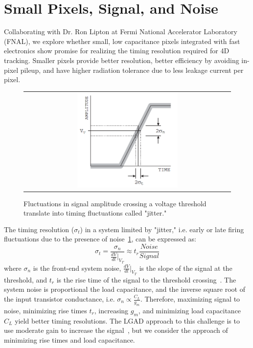 \section{Small Pixels, Signal, and Noise}
Collaborating with Dr. Ron Lipton at Fermi National Accelerator Laboratory (FNAL), we explore whether small, low capacitance pixels integrated with fast electronics show promise for realizing the timing resolution required for 4D tracking.
Smaller pixels provide better resolution, better efficiency by avoiding in-pixel pileup, and have higher radiation tolerance due to less leakage current per pixel.

\begin{figure}[h]
  \begin{center}
    \begin{tabular}{c}
        \includegraphics[width=0.5\textwidth]{fig_FastTiming/Jitter.png}
    \end{tabular}
    \caption{Fluctuations in signal amplitude crossing a voltage threshold translate into timing fluctuations called "jitter."
            }            
    \label{Jitter}
  \end{center}
\end{figure}
The timing resolution ($\sigma_t$) in a system limited by "jitter," i.e. early or late firing fluctuations due to the presence of noise~\ref{Jitter}, can be expressed as:
\begin{equation}
\sigma_t =\frac{\sigma_n}{\frac{d V}{d t}\vert_{V_T}} \approx t_r\frac{Noise}{Signal}
\end{equation}
where $\sigma_n$ is the front-end system noise, $\frac{d V}{d t}\vert_{V_T}$ is the slope of the signal at the threshold, and $t_r$ is the rise time of the signal to the threshold crossing~\cite{4336333}.
The system noise is proportional the load capacitance, and the inverse square root of the input transistor conductance, i.e. $\sigma_n \propto \frac{C_L}{g_m}$.
Therefore, maximizing signal to noise, minimizing rise times $t_r$, increasing $g_m$, and minimizing load capacitance $C_L$ yield better timing resolutions.
The LGAD approach to this challenge is to use moderate gain to increase the signal~\cite{SADROZINSKI2013226}, but we consider the approach of minimizing rise times and load capacitance.

